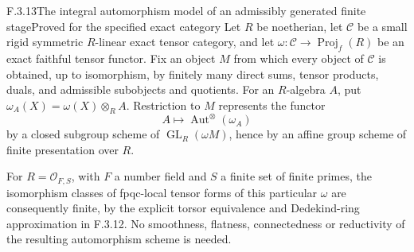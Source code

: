 \begin{result}{F.3.13}{The integral automorphism model of an admissibly generated finite stage}{Proved for the specified exact category}
Let $R$ be noetherian, let $\mathcal C$ be a small rigid symmetric $R$-linear exact tensor category, and let
$\omega:\mathcal C\to\operatorname{Proj}_f(R)$ be an exact faithful tensor functor. Fix an object $M$ from which every object of $\mathcal C$ is obtained, up to isomorphism, by finitely many direct sums, tensor products, duals, and admissible subobjects and quotients. For an $R$-algebra $A$, put $\omega_A(X)=\omega(X)\otimes_R A$. Restriction to $M$ represents the functor
\[
 A\longmapsto\operatorname{Aut}^{\otimes}(\omega_A)
\]
by a closed subgroup scheme of $\operatorname{GL}_R(\omega M)$, hence by an affine group scheme of finite presentation over $R$.

For $R=\mathcal O_{F,S}$, with $F$ a number field and $S$ a finite set of finite primes, the isomorphism classes of fpqc-local tensor forms of this particular $\omega$ are consequently finite, by the explicit torsor equivalence and Dedekind-ring approximation in F.3.12. No smoothness, flatness, connectedness or reductivity of the resulting automorphism scheme is needed.
\end{result}
